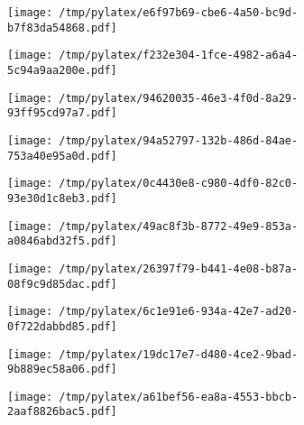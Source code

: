 \documentclass{article}
\begin{document}
\begin{figure}[htbp]
\begin{subfigure}[b]{.3\linewidth}
\texttt{[image: /tmp/pylatex/e6f97b69-cbe6-4a50-bc9d-b7f83da54868.pdf]}
\end{subfigure}
\begin{subfigure}[b]{.3\linewidth}
\texttt{[image: /tmp/pylatex/f232e304-1fce-4982-a6a4-5c94a9aa200e.pdf]}
\end{subfigure}
\begin{subfigure}[b]{.3\linewidth}
\texttt{[image: /tmp/pylatex/94620035-46e3-4f0d-8a29-93ff95cd97a7.pdf]}
\end{subfigure}
\begin{subfigure}[b]{.3\linewidth}
\texttt{[image: /tmp/pylatex/94a52797-132b-486d-84ae-753a40e95a0d.pdf]}
\end{subfigure}
\begin{subfigure}[b]{.3\linewidth}
\texttt{[image: /tmp/pylatex/0c4430e8-c980-4df0-82c0-93e30d1c8eb3.pdf]}
\end{subfigure}
\begin{subfigure}[b]{.3\linewidth}
\texttt{[image: /tmp/pylatex/49ac8f3b-8772-49e9-853a-a0846abd32f5.pdf]}
\end{subfigure}
\begin{subfigure}[b]{.3\linewidth}
\texttt{[image: /tmp/pylatex/26397f79-b441-4e08-b87a-08f9c9d85dac.pdf]}
\end{subfigure}
\begin{subfigure}[b]{.3\linewidth}
\texttt{[image: /tmp/pylatex/6c1e91e6-934a-42e7-ad20-0f722dabbd85.pdf]}
\end{subfigure}
\begin{subfigure}[b]{.3\linewidth}
\texttt{[image: /tmp/pylatex/19dc17e7-d480-4ce2-9bad-9b889ec58a06.pdf]}
\end{subfigure}
\begin{subfigure}[b]{.3\linewidth}
\texttt{[image: /tmp/pylatex/a61bef56-ea8a-4553-bbcb-2aaf8826bac5.pdf]}
\end{subfigure}
\end{figure}
\end{document}
